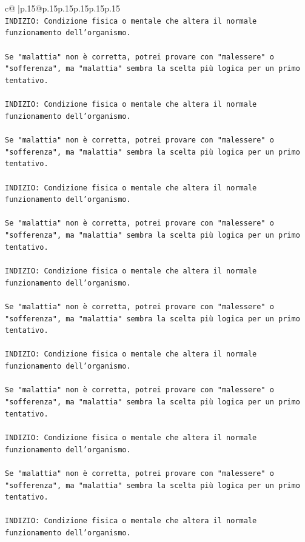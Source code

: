 \documentclass{article}
\begin{document}
{\begin{supertabular}{c@{$\;$}|p{.15\linewidth}@{}p{.15\linewidth}p{.15\linewidth}p{.15\linewidth}p{.15\linewidth}p{.15\linewidth}}
{{{\\ 
\texttt{INDIZIO: Condizione fisica o mentale che altera il normale funzionamento dell'organismo.} \\
\\ 
\texttt{Se "malattia" non è corretta, potrei provare con "malessere" o "sofferenza", ma "malattia" sembra la scelta più logica per un primo tentativo.} \\
\\ 
\texttt{INDIZIO: Condizione fisica o mentale che altera il normale funzionamento dell'organismo.} \\
\\ 
\texttt{Se "malattia" non è corretta, potrei provare con "malessere" o "sofferenza", ma "malattia" sembra la scelta più logica per un primo tentativo.} \\
\\ 
\texttt{INDIZIO: Condizione fisica o mentale che altera il normale funzionamento dell'organismo.} \\
\\ 
\texttt{Se "malattia" non è corretta, potrei provare con "malessere" o "sofferenza", ma "malattia" sembra la scelta più logica per un primo tentativo.} \\
\\ 
\texttt{INDIZIO: Condizione fisica o mentale che altera il normale funzionamento dell'organismo.} \\
\\ 
\texttt{Se "malattia" non è corretta, potrei provare con "malessere" o "sofferenza", ma "malattia" sembra la scelta più logica per un primo tentativo.} \\
\\ 
\texttt{INDIZIO: Condizione fisica o mentale che altera il normale funzionamento dell'organismo.} \\
\\ 
\texttt{Se "malattia" non è corretta, potrei provare con "malessere" o "sofferenza", ma "malattia" sembra la scelta più logica per un primo tentativo.} \\
\\ 
\texttt{INDIZIO: Condizione fisica o mentale che altera il normale funzionamento dell'organismo.} \\
\\ 
\texttt{Se "malattia" non è corretta, potrei provare con "malessere" o "sofferenza", ma "malattia" sembra la scelta più logica per un primo tentativo.} \\
\\ 
\texttt{INDIZIO: Condizione fisica o mentale che altera il normale funzionamento dell'organismo.} \\
}}}
\end{supertabular}}
\end{document}
